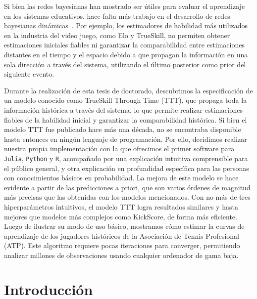 \documentclass[a4paper,11pt]{book}
\theoremstyle{definition}
\newif\ifen
\newif\ifes
\newcommand{\en}[1]{\ifen#1\fi}
\newcommand{\es}[1]{\ifes#1\fi}
\begin{document}
Si bien las redes bayesianas han mostrado ser \'utiles para evaluar el aprendizaje en los sistemas educativos, hace falta m\'as trabajo en el desarrollo de redes bayesianas din\'amicas~\cite{Almond2015}.
%
Por ejemplo, los estimadores de habilidad m\'as utilizados en la industria del video juego, como Elo y TrueSkill, no permiten obtener estimaciones iniciales fiables ni garantizar la comparabilidad entre estimaciones distantes en el tiempo y el espacio debido a que propagan la informaci\'on en una sola direcci\'on a trav\'es del sistema, utilizando el \'ultimo posterior como prior del siguiente evento.

Durante la realizaci\'on de esta tesis de doctorado, descubrimos la especificaci\'on de un modelo conocido como TrueSkill Through Time (TTT), que propaga toda la informaci\'on hist\'orica a trav\'es del sistema, lo que permite realizar estimaciones fiables de la habilidad inicial y garantizar la comparabilidad hist\'orica.
%
Si bien el modelo TTT fue publicado hace m\'as una d\'ecada, no se encontraba disponible hasta entonces en ning\'un lenguaje de programaci\'on.
%
Por ello, decidimos realizar nuestra propia implementaci\'on con la que ofrecimos el primer software para \texttt{Julia}, \texttt{Python} y \texttt{R}, acompa\~nado por una explicaci\'on intuitiva comprensible para el p\'ublico general, y otra explicaci\'on en profundidad espec\'ifica para las personas con conocimientos b\'asicos en probabilidad.
%
La mejora de este modelo se hace evidente a partir de las predicciones a priori, que son varios \'ordenes de magnitud m\'as precisas que las obtenidas con los modelos mencionados.
%
Con no m\'as de tres hiperpar\'ametros intuitivos, el modelo TTT logra resultados similares y hasta mejores que modelos m\'as complejos como KickScore, de forma m\'as eficiente.
%
Luego de ilustrar su modo de uso b\'asico, mostramos c\'omo estimar la curvas de aprendizaje de los jugadores hist\'oricos de la Asociaci\'on de Tennis Profesional (ATP).
%
Este algoritmo requiere pocas iteraciones para converger, permitiendo analizar millones de observaciones usando cualquier ordenador de gama baja.

\section{Introducci\'on} \label{sec:intro}

\end{document}
